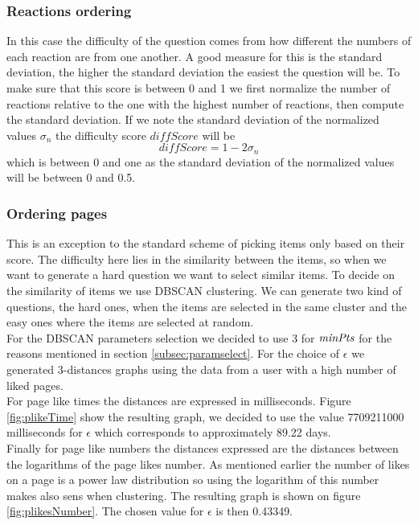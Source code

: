 \subsubsection{Reactions ordering}
In this case the difficulty of the question comes from how different the numbers of each reaction are from one another. A good measure for this is the standard deviation, the higher the standard deviation the easiest the question will be. To make sure that this score is between 0 and 1 we first normalize the number of reactions relative to the one with the highest number of reactions, then compute the standard deviation. If we note the standard deviation of the normalized values $\sigma_n$ the difficulty score $\mathit{diffScore}$ will be $$\mathit{diffScore} = 1 - 2 \sigma_n$$ which is between 0 and one as the standard deviation of the normalized values will be between 0 and 0.5.
\subsubsection{Ordering pages}\label{subsubsec:orderpages}
This is an exception to the standard scheme of picking items only based on their score. The difficulty here lies in the similarity between the items, so when we want to generate a hard question we want to select similar items. To decide on the similarity of items we use DBSCAN clustering. We can generate two kind of questions, the hard ones, when the items are selected in the same cluster and the easy ones where the items are selected at random.\\
For the DBSCAN parameters selection we decided to use 3 for $\mathit{minPts}$ for the reasons mentioned in section \ref{subsec:paramselect}. For the choice of $\epsilon$ we generated 3-distances graphs using the data from a user with a high number of liked pages.\\
For page like times the distances are expressed in milliseconds. Figure \ref{fig:plikeTime} show the resulting graph, we decided to use the value 7709211000 milliseconds for $\epsilon$ which corresponds to approximately 89.22 days.\\
Finally for page like numbers the distances expressed are the distances between the logarithms of the page likes number. As mentioned earlier the number of likes on a page is a power law distribution so using the logarithm of this number makes also sens when clustering. The resulting graph is shown on figure \ref{fig:plikesNumber}. The chosen value for $\epsilon$ is then 0.43349.

